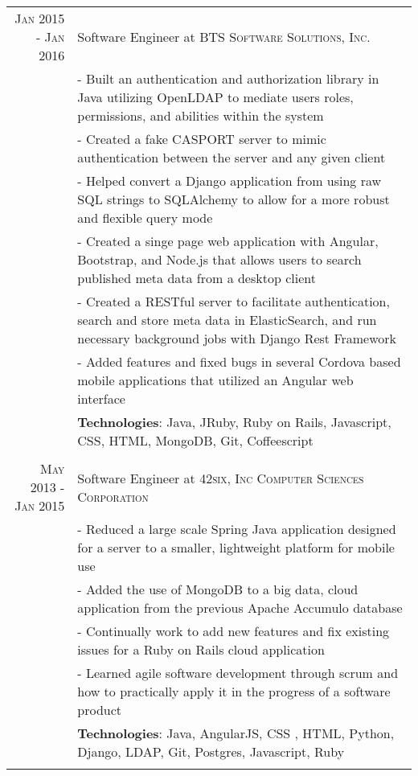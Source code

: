 \documentclass[a4paper,11pt]{article} %
\begin{document}
\begin{tabular}{r|p{11cm}}
\textsc{Jan 2015 - Jan 2016} & Software Engineer at \textsc{BTS Software Solutions, Inc.}\\
& \footnotesize{- Built an authentication and authorization library in Java utilizing OpenLDAP to mediate users roles, permissions, and abilities within the system}\\
& \footnotesize{- Created a fake CASPORT server to mimic authentication between the server and any given client}\\
& \footnotesize{- Helped convert a Django application from using raw SQL strings to SQLAlchemy to allow for a more robust and flexible query mode}\\
& \footnotesize{- Created a singe page web application with Angular, Bootstrap, and Node.js that allows users to search published meta data from a desktop client}\\
& \footnotesize{- Created a RESTful server to facilitate authentication, search and store meta data in ElasticSearch, and run necessary background jobs with Django Rest Framework}\\
& \footnotesize{- Added features and fixed bugs in several Cordova based mobile applications that utilized an Angular web interface}\\
& \footnotesize{\textbf{Technologies}: Java, JRuby, Ruby on Rails, Javascript, CSS, HTML, MongoDB, Git, Coffeescript }\\
\multicolumn{2}{c}{} \\


\textsc{May 2013 - Jan 2015} & Software Engineer at \textsc{42six, Inc Computer Sciences Corporation}\\
& \footnotesize{- Reduced a large scale Spring Java application designed for a server to a smaller, lightweight platform for mobile use}\\
& \footnotesize{- Added the use of MongoDB to a big data, cloud application from the previous Apache Accumulo database}\\
& \footnotesize{- Continually work to add new features and fix existing issues for a Ruby on Rails cloud application}\\
& \footnotesize{- Learned agile software development through scrum and how to practically apply it in the progress of a software product}\\
& \footnotesize{\textbf{Technologies}: Java, AngularJS, CSS , HTML, Python, Django, LDAP, Git, Postgres, Javascript, Ruby}\\
\multicolumn{2}{c}{} \\

\end{tabular}
\end{document}
